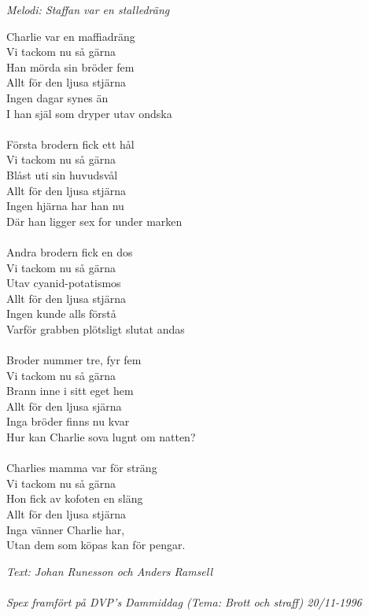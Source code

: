 {\footnotesize\textit{Melodi: Staffan var en stalledräng}}\par
\vspace{10pt}
Charlie var en maffiadräng\\
Vi tackom nu så gärna\\
Han mörda sin bröder fem\\
Allt för den ljusa stjärna\\
Ingen dagar synes än\\
I han själ som dryper utav ondska\\
\\
Första brodern fick ett hål\\
Vi tackom nu så gärna\\
Blåst uti sin huvudsvål\\
Allt för den ljusa stjärna\\
Ingen hjärna har han nu\\
Där han ligger sex for under marken\\
\\
Andra brodern fick en dos\\
Vi tackom nu så gärna\\
Utav cyanid-potatismos\\
Allt för den ljusa stjärna\\
Ingen kunde alls förstå\\
Varför grabben plötsligt slutat andas\\
\\
Broder nummer tre, fyr fem\\
Vi tackom nu så gärna\\
Brann inne i sitt eget hem\\
Allt för den ljusa sjärna\\
Inga bröder finns nu kvar\\
Hur kan Charlie sova lugnt om natten?\\
\\
Charlies mamma var för sträng\\
Vi tackom nu så gärna\\
Hon fick av kofoten en släng\\
Allt för den ljusa stjärna\\
Inga vänner Charlie har,\\
Utan dem som köpas kan för pengar.\par
\vspace{10pt}
{\footnotesize\textit{Text: Johan Runesson och Anders Ramsell}}\\
\\
{\footnotesize\textit{Spex framfört på DVP's Dammiddag (Tema: Brott och straff) 20/11-1996}}\\
